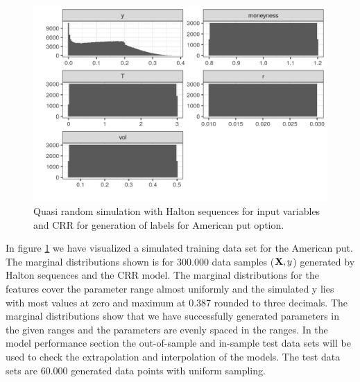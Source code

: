 \begin{figure}[th]
\centering
\includegraphics{Figures/marginalAmerPut.png}
\decoRule
\caption[Marginal Distributions for American Put]{Quasi random simulation with Halton sequences for input variables and CRR for generation of labels for American put option.}
\label{fig:marginalAmerPut}
\end{figure}

In figure \ref{fig:marginalAmerPut} we have visualized a simulated training data set for the American put. The marginal distributions shown is for $300.000$ data samples ($\mathbf{X},y$) generated by Halton sequences and the CRR model. The marginal distributions for the features cover the parameter range almost uniformly and the simulated y lies with most values at zero and maximum at 0.387 rounded to three decimals. The marginal distributions show that we have successfully generated parameters in the given ranges and the parameters are evenly spaced in the ranges. In the model performance section the out-of-sample and in-sample test data sets will be used to check the extrapolation and interpolation of the models. The test data sets are 60.000 generated data points with uniform sampling.


